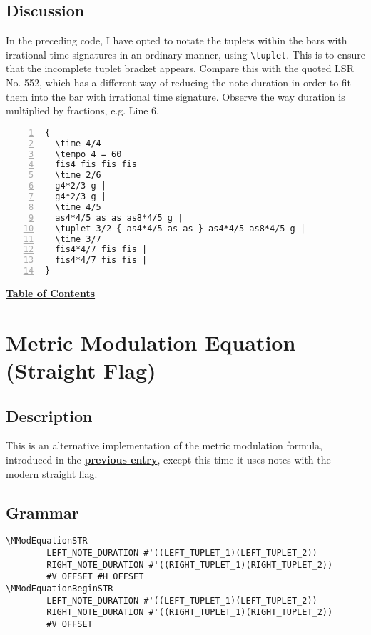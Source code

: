 \subsection{Discussion}

In the preceding code, I have opted to notate the tuplets within the bars with irrational time signatures in an ordinary manner, using \Verb|\tuplet|. This is to ensure that the incomplete tuplet bracket appears. Compare this with the quoted LSR No. 552, which has a different way of reducing the note duration in order to fit them into the bar with irrational time signature. Observe the way duration is multiplied by fractions, e.g. Line 6.

\begin{Verbatim}[numbers=left,xleftmargin=5mm]
 {
  \time 4/4
  \tempo 4 = 60
  fis4 fis fis fis
  \time 2/6
  g4*2/3 g |
  g4*2/3 g |
  \time 4/5
  as4*4/5 as as as8*4/5 g |
  \tuplet 3/2 { as4*4/5 as as } as4*4/5 as8*4/5 g |
  \time 3/7
  fis4*4/7 fis fis |
  fis4*4/7 fis fis |
}
\end{Verbatim}


\hyperref[sec:toc]{\textbf{Table of Contents}}

\vfill \break




\section {Metric Modulation Equation (Straight Flag)}

\label{sec:metricModulationStraightFlag}

\subsection{Description}

This is an alternative implementation of the metric modulation formula, introduced in the \hyperref[sec:metricModulationRegularFlag]{\textbf{previous entry}}, except this time it uses notes with the modern straight flag.

\subsection{Grammar}
\begin{verbatim}
\MModEquationSTR 
		LEFT_NOTE_DURATION #'((LEFT_TUPLET_1)(LEFT_TUPLET_2)) 
		RIGHT_NOTE_DURATION #'((RIGHT_TUPLET_1)(RIGHT_TUPLET_2)) 
		#V_OFFSET #H_OFFSET
\MModEquationBeginSTR 
		LEFT_NOTE_DURATION #'((LEFT_TUPLET_1)(LEFT_TUPLET_2)) 
		RIGHT_NOTE_DURATION #'((RIGHT_TUPLET_1)(RIGHT_TUPLET_2)) 
		#V_OFFSET
\end{verbatim}

